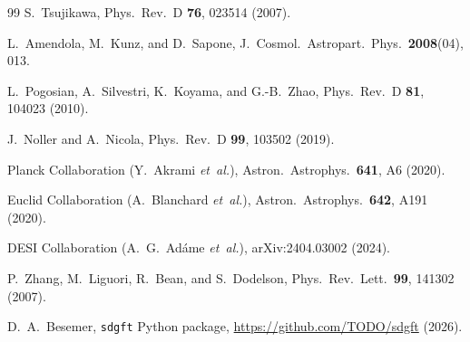 \documentclass[amsmath,amssymb,aps,prd,twocolumn,superscriptaddress,nofootinbib]{revtex4-2}
\begin{document}
\begin{thebibliography}{99}
S.~Tsujikawa,
Phys.\ Rev.\ D \textbf{76}, 023514 (2007).

L.~Amendola, M.~Kunz, and D.~Sapone,
J.\ Cosmol.\ Astropart.\ Phys.\ \textbf{2008}(04), 013.

L.~Pogosian, A.~Silvestri, K.~Koyama, and G.-B.~Zhao,
Phys.\ Rev.\ D \textbf{81}, 104023 (2010).

J.~Noller and A.~Nicola,
Phys.\ Rev.\ D \textbf{99}, 103502 (2019).

Planck Collaboration (Y.~Akrami {\it et~al.}),
Astron.\ Astrophys.\ \textbf{641}, A6 (2020).

Euclid Collaboration (A.~Blanchard {\it et~al.}),
Astron.\ Astrophys.\ \textbf{642}, A191 (2020).

DESI Collaboration (A.~G.~Ad{\'a}me {\it et~al.}),
arXiv:2404.03002 (2024).

P.~Zhang, M.~Liguori, R.~Bean, and S.~Dodelson,
Phys.\ Rev.\ Lett.\ \textbf{99}, 141302 (2007).

D.~A.~Besemer, \texttt{sdgft} Python package,
\url{https://github.com/TODO/sdgft} (2026).

\end{thebibliography}
\end{document}
